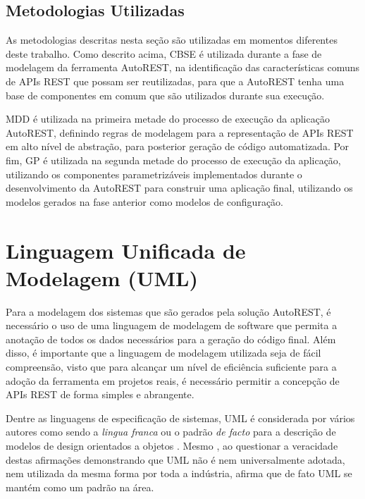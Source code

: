 \subsection{Metodologias Utilizadas}

As metodologias descritas nesta seção são utilizadas em momentos diferentes deste trabalho. Como descrito acima, CBSE é utilizada durante a fase de modelagem da ferramenta AutoREST, na identificação das características comuns de APIs REST que possam ser reutilizadas, para que a AutoREST tenha uma base de componentes em comum que são utilizados durante sua execução.

MDD é utilizada na primeira metade do processo de execução da aplicação AutoREST, definindo regras de modelagem para a representação de APIs REST em alto nível de abstração, para posterior geração de código automatizada. Por fim, GP é utilizada na segunda metade do processo de execução da aplicação, utilizando os componentes parametrizáveis implementados durante o desenvolvimento da AutoREST para construir uma aplicação final, utilizando os modelos gerados na fase anterior como modelos de configuração.


\section{Linguagem Unificada de Modelagem (UML)}

Para a modelagem dos sistemas que são gerados pela solução AutoREST, é necessário o uso de uma linguagem de modelagem de software que permita a anotação de todos os dados necessários para a geração do código final. Além disso, é importante que a linguagem de modelagem utilizada seja de fácil compreensão, visto que para alcançar um nível de eficiência suficiente para a adoção da ferramenta em projetos reais, é necessário permitir a concepção de APIs REST de forma simples e abrangente.

Dentre as linguagens de especificação de sistemas, UML é considerada por vários autores como sendo a \textit{lingua franca} \cite{EVANS:2000} ou o padrão \textit{de facto} para a descrição de modelos de design orientados a objetos \cite{BUDGEN:2011}. Mesmo , ao questionar a veracidade destas afirmações demonstrando que UML não é nem universalmente adotada, nem utilizada da mesma forma por toda a indústria, afirma que de fato UML se mantém como um padrão na área.

